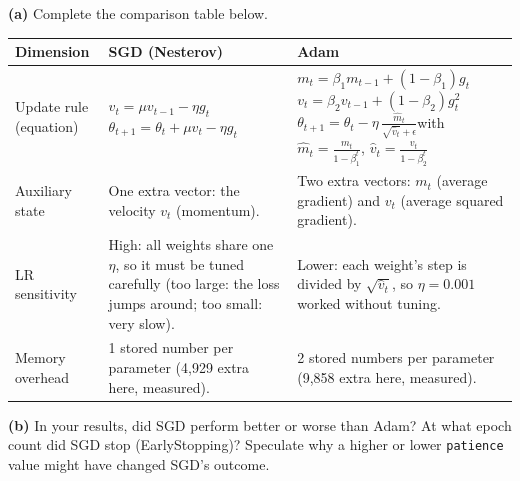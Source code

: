 \documentclass[12pt,a4paper]{article}
\begin{document}
\begin{tcolorbox}[colback=lightblue!40, colframe=myColorB,
  title={\textbf{Question 3 — Adaptive vs.\ Non-Adaptive Optimizers} \hfill \normalfont(10 pts)},
  fonttitle=\normalsize\bfseries, breakable]

\textbf{(a)} Complete the comparison table below.

\vspace{6pt}
\begin{center}
\renewcommand{\arraystretch}{1.5}
\begin{tabular}{|p{3.5cm}|p{4.5cm}|p{4.5cm}|}
\hline
\textbf{Dimension} & \textbf{SGD (Nesterov)} & \textbf{Adam} \\
\hline
Update rule (equation) & \small $v_t=\mu v_{t-1}-\eta g_t$\newline $\theta_{t+1}=\theta_t+\mu v_t-\eta g_t$ & \small $m_t=\beta_1 m_{t-1}+(1-\beta_1)g_t$\newline $v_t=\beta_2 v_{t-1}+(1-\beta_2)g_t^2$\newline $\theta_{t+1}=\theta_t-\eta\,\frac{\hat m_t}{\sqrt{\hat v_t}+\epsilon}$\newline with $\hat m_t=\frac{m_t}{1-\beta_1^t}$, $\hat v_t=\frac{v_t}{1-\beta_2^t}$ \\[4pt]
\hline
Auxiliary state & \small One extra vector: the velocity $v_t$ (momentum). & \small Two extra vectors: $m_t$ (average gradient) and $v_t$ (average squared gradient). \\[4pt]
\hline
LR sensitivity & \small High: all weights share one $\eta$, so it must be tuned carefully (too large: the loss jumps around; too small: very slow). & \small Lower: each weight's step is divided by $\sqrt{\hat v_t}$, so $\eta=0.001$ worked without tuning. \\[4pt]
\hline
Memory overhead & \small 1 stored number per parameter (4,929 extra here, measured). & \small 2 stored numbers per parameter (9,858 extra here, measured). \\[4pt]
\hline
\end{tabular}
\end{center}

\textbf{(b)} In your results, did SGD perform better or worse than Adam? At what
epoch count did SGD stop (EarlyStopping)? Speculate why a higher or lower
\texttt{patience} value might have changed SGD's outcome.
\end{tcolorbox}
\end{document}
